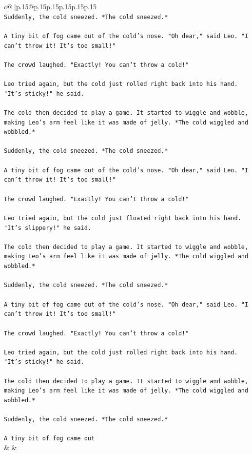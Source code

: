 \documentclass{article}
\begin{document}
{\begin{supertabular}{c@{$\;$}|p{.15\linewidth}@{}p{.15\linewidth}p{.15\linewidth}p{.15\linewidth}p{.15\linewidth}p{.15\linewidth}}
{{{\\ 
\texttt{Suddenly, the cold sneezed. *The cold sneezed.*} \\
\\ 
\texttt{A tiny bit of fog came out of the cold's nose. "Oh dear," said Leo. "I can't throw it! It's too small!"} \\
\\ 
\texttt{The crowd laughed. "Exactly! You can't throw a cold!"} \\
\\ 
\texttt{Leo tried again, but the cold just rolled right back into his hand. "It's sticky!" he said.} \\
\\ 
\texttt{The cold then decided to play a game. It started to wiggle and wobble, making Leo's arm feel like it was made of jelly. *The cold wiggled and wobbled.*} \\
\\ 
\texttt{Suddenly, the cold sneezed. *The cold sneezed.*} \\
\\ 
\texttt{A tiny bit of fog came out of the cold's nose. "Oh dear," said Leo. "I can't throw it! It's too small!"} \\
\\ 
\texttt{The crowd laughed. "Exactly! You can't throw a cold!"} \\
\\ 
\texttt{Leo tried again, but the cold just floated right back into his hand. "It's slippery!" he said.} \\
\\ 
\texttt{The cold then decided to play a game. It started to wiggle and wobble, making Leo's arm feel like it was made of jelly. *The cold wiggled and wobbled.*} \\
\\ 
\texttt{Suddenly, the cold sneezed. *The cold sneezed.*} \\
\\ 
\texttt{A tiny bit of fog came out of the cold's nose. "Oh dear," said Leo. "I can't throw it! It's too small!"} \\
\\ 
\texttt{The crowd laughed. "Exactly! You can't throw a cold!"} \\
\\ 
\texttt{Leo tried again, but the cold just rolled right back into his hand. "It's sticky!" he said.} \\
\\ 
\texttt{The cold then decided to play a game. It started to wiggle and wobble, making Leo's arm feel like it was made of jelly. *The cold wiggled and wobbled.*} \\
\\ 
\texttt{Suddenly, the cold sneezed. *The cold sneezed.*} \\
\\ 
\texttt{A tiny bit of fog came out} \\
            }
        }
    }
    & & \\ \\


\end{supertabular}}
\end{document}
